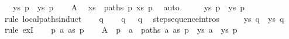\begin{isabellebody}
\ \ \ {\isachardoublequoteopen}{\isasymexists}ys{\isachardot}{\kern0pt}\ p\ {\isasymmapsto}{\isachardollar}{\kern0pt}\ ys\ p{\isacharprime}{\kern0pt}{\isachardoublequoteclose}\isanewline
%
\isadelimproof
%
\endisadelimproof
%
\isatagproof
{}\isamarkupfalse%
{\isacharminus}{\kern0pt}\isanewline
\ \ \isamarkupfalse%
\ A{}\ \isamarkupfalse%
\ xs\ \ {\isachardoublequoteopen}paths\ p\ xs\ p{\isacharprime}{\kern0pt}{\isachardoublequoteclose}\ \isamarkupfalse%
\ auto\isanewline
\ \ \isamarkupfalse%
\ \isamarkupfalse%
\ {\isachardoublequoteopen}{\isasymexists}ys{\isachardot}{\kern0pt}\ p\ {\isasymmapsto}{\isachardollar}{\kern0pt}\ ys\ p{\isacharprime}{\kern0pt}{\isachardoublequoteclose}\isanewline
{}\isamarkupfalse%
\ {\isacharparenleft}{\kern0pt}rule\ local{\isachardot}{\kern0pt}paths{\isachardot}{\kern0pt}induct{\isacharparenright}{\kern0pt}\isanewline
\ \ \isamarkupfalse%
\ q\isanewline
\ \ \isamarkupfalse%
\ {\isachardoublequoteopen}q\ {\isasymmapsto}{\isachardollar}{\kern0pt}\ {\isacharbrackleft}{\kern0pt}{\isacharbrackright}{\kern0pt}\ q{\isachardoublequoteclose}\ \isamarkupfalse%
\ step{\isacharunderscore}{\kern0pt}sequence{\isachardot}{\kern0pt}intros{\isacharparenleft}{\kern0pt}{}{\isacharparenright}{\kern0pt}\isacommand{{\isachardot}{\kern0pt}}\isamarkupfalse%
\isanewline
\ \ \isamarkupfalse%
\ \isamarkupfalse%
\ {\isachardoublequoteopen}{\isasymexists}ys{\isachardot}{\kern0pt}\ q\ {\isasymmapsto}{\isachardollar}{\kern0pt}\ ys\ q{\isachardoublequoteclose}\ \isamarkupfalse%
\ {\isacharparenleft}{\kern0pt}rule\ exI{\isacharparenright}{\kern0pt}\isanewline
{}\isamarkupfalse%
\isanewline
\ \ \isamarkupfalse%
\ p\ a\ as\ p{\isacharprime}{\kern0pt}{\isacharprime}{\kern0pt}\isanewline
\ \ \isamarkupfalse%
\ A{}{\isacharcolon}{\kern0pt}\ {\isachardoublequoteopen}{\isasymexists}{\isasymalpha}{\isachardot}{\kern0pt}\ p\ {\isasymmapsto}{\isasymalpha}\ a\ {\isasymand}\ paths\ a\ as\ p{\isacharprime}{\kern0pt}{\isacharprime}{\kern0pt}\ {\isasymand}\ {\isacharparenleft}{\kern0pt}{\isasymexists}ys{\isachardot}{\kern0pt}\ a\ {\isasymmapsto}{\isachardollar}{\kern0pt}\ ys\ p{\isacharprime}{\kern0pt}{\isacharprime}{\kern0pt}{\isacharparenright}{\kern0pt}{\isachardoublequoteclose}\isanewline
\ \ \isamarkupfalse%
\ \isamarkupfalse%

\end{isabellebody}
